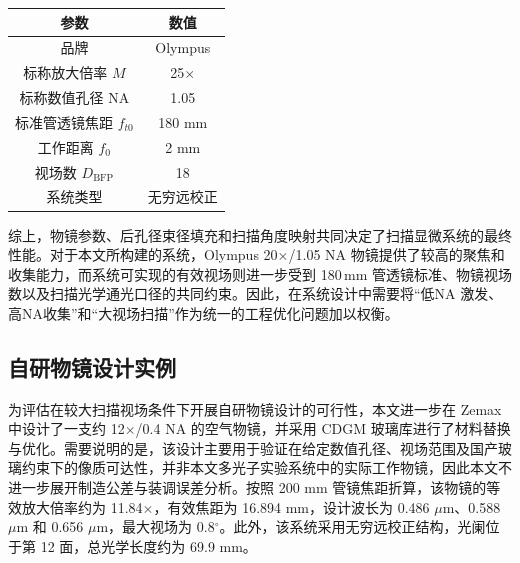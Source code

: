 \begin{table}[htbp]
\label{tab:olympus_obj}
\centering
\begin{tabular}{|c|c|}
\hline
参数 & 数值 \\ \hline
品牌 & Olympus \\ \hline
标称放大倍率 $M$ & 25$\times$ \\ \hline
标称数值孔径 NA & 1.05 \\ \hline
标准管透镜焦距 $f_{t0}$ & 180 mm \\ \hline
工作距离 $f_0$ & 2 mm \\ \hline
视场数 $D_{\mathrm{BFP}}$ & 18 \\ \hline
系统类型 & 无穷远校正 \\ \hline
\end{tabular}
\end{table}

综上，物镜参数、后孔径束径填充和扫描角度映射共同决定了扫描显微系统的最终性能。对于本文所构建的系统，Olympus 20$\times$/1.05 NA 物镜提供了较高的聚焦和收集能力，而系统可实现的有效视场则进一步受到 180\,mm 管透镜标准、物镜视场数以及扫描光学通光口径的共同约束。因此，在系统设计中需要将``低NA 激发、高NA收集''和``大视场扫描''作为统一的工程优化问题加以权衡。


\subsection{自研物镜设计实例}\label{2.4.5}

为评估在较大扫描视场条件下开展自研物镜设计的可行性，本文进一步在 Zemax 中设计了一支约 12$\times$/0.4 NA 的空气物镜，并采用 CDGM 玻璃库进行了材料替换与优化。需要说明的是，该设计主要用于验证在给定数值孔径、视场范围及国产玻璃约束下的像质可达性，并非本文多光子实验系统中的实际工作物镜，因此本文不进一步展开制造公差与装调误差分析。按照 200 mm 管镜焦距折算，该物镜的等效放大倍率约为 11.84$\times$，有效焦距为 16.894 mm，设计波长为 0.486 $\mu$m、0.588 $\mu$m 和 0.656 $\mu$m，最大视场为 0.8$^\circ$。此外，该系统采用无穷远校正结构，光阑位于第 12 面，总光学长度约为 69.9 mm。

